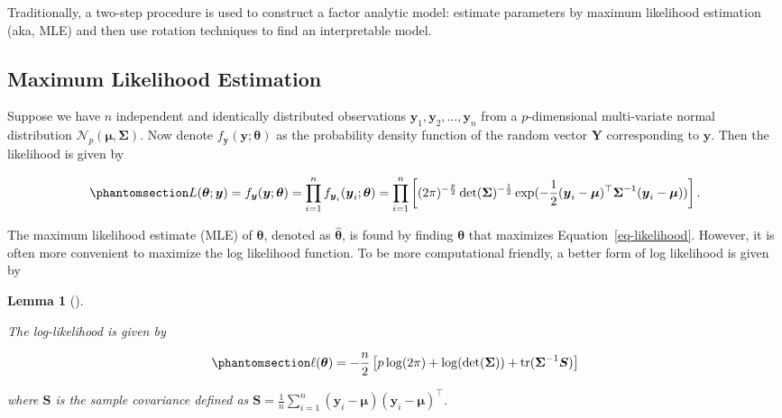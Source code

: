 \documentclass[
  a4paper,
  oneside,
  openany,
  12pt,
  onecolumn,
  twoside]{book}
\theoremstyle{plain}
\newtheorem{lemma}{Lemma}[chapter]
\theoremstyle{remark}
\begin{document}
Traditionally, a two-step procedure is used to construct a factor
analytic model: estimate parameters by maximum likelihood estimation
(aka, MLE) and then use rotation techniques to find an interpretable
model.

\subsection{Maximum Likelihood
Estimation}\label{maximum-likelihood-estimation}

Suppose we have \(n\) independent and identically distributed
observations
\(\boldsymbol{y}_1,\boldsymbol{y}_2,\dots,\boldsymbol{y}_n\) from a
\(p\)-dimensional multi-variate normal distribution
\(\mathcal{N}_p(\boldsymbol{\mu},\boldsymbol{\Sigma})\). Now denote
\(f_{\boldsymbol{y}}(\boldsymbol{y};\boldsymbol{\theta})\) as the
probability density function of the random vector \(\boldsymbol{Y}\)
corresponding to \(\boldsymbol{y}\). Then the likelihood is given by

\begin{equation}\phantomsection\label{eq-likelihood}{
L(\boldsymbol{\theta};\boldsymbol{y})=f_{\boldsymbol{y}}(\boldsymbol{y};\boldsymbol{\theta}) = \prod^n_{i=1}f_{\boldsymbol{y}_i}(\boldsymbol{y}_i;\boldsymbol{\theta}) =  \prod^n_{i=1}\left[(2\pi)^{-\frac{p}{2}}\det(\boldsymbol{\Sigma})^{-\frac{1}{2}}\exp(-\frac{1}{2}(\boldsymbol{y}_i-\boldsymbol{\mu})^\top\boldsymbol{\Sigma}^{-1}(\boldsymbol{y}_i-\boldsymbol{\mu}))\right].
}\end{equation}

The maximum likelihood estimate (MLE) of \(\boldsymbol{\theta}\),
denoted as \(\hat{\boldsymbol{\theta}}\), is found by finding
\(\boldsymbol{\theta}\) that maximizes Equation~\ref{eq-likelihood}.
However, it is often more convenient to maximize the log likelihood
function. To be more computational friendly, a better form of log
likelihood is given by

\begin{lemma}[]\protect\hypertarget{lem-MLE}{}\label{lem-MLE}

The log-likelihood is given by

\begin{equation}\phantomsection\label{eq-loglikelihood}{\ell(\boldsymbol{\theta}) =  -\frac{n}{2}\left[p\log(2\pi)+\log(\det(\boldsymbol{\Sigma}))+\text{tr}(\boldsymbol{\Sigma}^{-1}\boldsymbol{S})\right]}\end{equation}

where \(\boldsymbol{S}\) is the sample covariance defined as
\(\boldsymbol{S}=\frac{1}{n}\sum^n_{i=1}(\boldsymbol{y}_i-\boldsymbol{\mu})(\boldsymbol{y}_i-\boldsymbol{\mu})^\top\).

\end{lemma}
\end{document}
